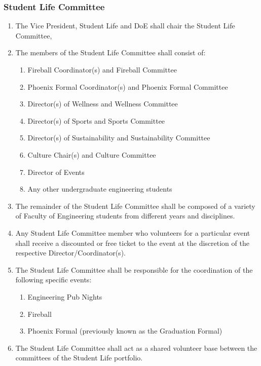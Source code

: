 \subsubsection{Student Life Committee}
\label{student-life-committee}
\begin{enumerate}
 \item
  The Vice President, Student Life and DoE shall chair the Student Life Committee,
 \item
  The members of the Student Life Committee shall consist of:

  \begin{enumerate}
   \item
    Fireball Coordinator(s) and Fireball Committee
   \item
    Phoenix Formal Coordinator(s) and Phoenix Formal Committee
   \item
    Director(s) of Wellness and Wellness Committee
   \item
    Director(s) of Sports and Sports Committee
   \item
    Director(s) of Sustainability and Sustainability Committee
   \item
    Culture Chair(s) and Culture Committee
   \item
    Director of Events
   \item
    Any other undergraduate engineering students
  \end{enumerate}
 \item
  The remainder of the Student Life Committee shall be composed of a variety of Faculty of Engineering students from different years and disciplines.
 \item
  Any Student Life Committee member who volunteers for a particular event shall receive a discounted or free ticket to the event at the discretion of the respective Director/Coordinator(s).
 \item
  The Student Life Committee shall be responsible for the coordination of the following specific events:

  \begin{enumerate}
   \item
    Engineering Pub Nights
   \item
    Fireball
   \item
    Phoenix Formal (previously known as the Graduation Formal)

  \end{enumerate}
 \item
  The Student Life Committee shall act as a shared volunteer base between the committees of the Student Life portfolio.
\end{enumerate}

